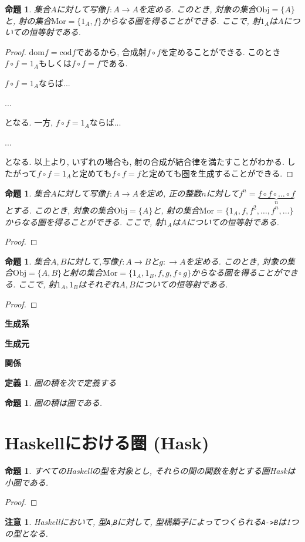 \documentclass[dvipdfmx]{jsbook}
\theoremstyle{plain}
\newtheorem{Def}[thm]{定義}
\newtheorem{Prop}[thm]{命題}
\newtheorem{caution}[thm]{注意}
\begin{document}
\begin{Prop}
集合$A$に対して写像$f:A\rightarrow A$を定める.
このとき, 対象の集合$\mathrm{Obj}=\{A\}$と, 射の集合$\mathrm{Mor}=\{1_A,f\}$からなる圏を得ることができる.
ここで, 射$1_A$は$A$についての恒等射である.
\end{Prop}
\begin{proof}
$\mathrm{dom} f=\mathrm{cod}f$であるから, 合成射$f\circ f$を定めることができる.
このとき$f\circ f=1_A$もしくは$f\circ f=f$である.

$f\circ f=1_A$ならば...

...

となる.
一方, $f\circ f=1_A$ならば...

...

となる.
以上より, いずれの場合も, 射の合成が結合律を満たすことがわかる.
したがって$f\circ f=1_A$と定めても$f\circ f=f$と定めても圏を生成することができる.
\end{proof}
\begin{Prop}
集合$A$に対して写像$f:A\rightarrow A$を定め, 正の整数$n$に対して$f^n=\underbrace{f\circ f \circ \dots \circ f}_{n}$
とする.
このとき, 対象の集合$\mathrm{Obj}=\{A\}$と, 射の集合$\mathrm{Mor}=\{1_A,f,f^2,\dots,f^n,\dots\}$からなる圏を得ることができる.
ここで, 射$1_A$は$A$についての恒等射である.
\end{Prop}
\begin{proof}
\end{proof}
\begin{Prop}
集合$A,B$に対して,写像$f:A\rightarrow B$と$g:\rightarrow A$を定める.
このとき, 対象の集合$\mathrm{Obj}=\{A,B\}$と射の集合$\mathrm{Mor}=\{1_A,1_B,f,g,f\circ g\}$からなる圏を得ることができる.
ここで, 射$1_A,1_B$はそれぞれ$A,B$についての恒等射である.
\end{Prop}
\begin{proof}
\end{proof}

{\bf 生成系}

{\bf 生成元}

{\bf 関係}

\begin{Def}
圏の積を次で定義する
\end{Def}
\begin{Prop}
圏の積は圏である.
\end{Prop}
\section{Haskellにおける圏 (Hask)}
\begin{Prop}
すべてのHaskellの型を対象とし, それらの間の関数を射とする圏Haskは小圏である.
\end{Prop}
\begin{proof}
\end{proof}
\begin{caution}
Haskellにおいて, 型\verb|A|,\verb|B|に対して, 型構築子によってつくられる\verb|A->B|は1つの型となる.
\end{caution}
\end{document}
